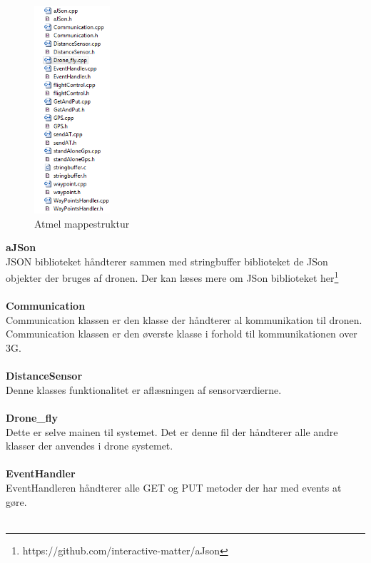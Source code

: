 \begin{figure}[H]
	\centering
	\includegraphics[width=0.25\textwidth]{Billeder/implementation/Howtoguide/atmel_filer.png}
	\caption{Atmel mappestruktur}
	\label{fig:drone_mappestruktur}
\end{figure}

\textbf{aJSon}\\
JSON biblioteket håndterer sammen med stringbuffer biblioteket de JSon objekter der bruges af dronen. Der kan læses mere om JSon biblioteket her\footnote{https://github.com/interactive-matter/aJson} \\ \\

\textbf{Communication}\\
Communication klassen er den klasse der håndterer al kommunikation til dronen. Communication klassen er den øverste klasse i forhold til kommunikationen over 3G. \\ \\

\textbf{DistanceSensor}\\
Denne klasses funktionalitet er aflæsningen af sensorværdierne. \\ \\

\textbf{Drone\_fly}\\
Dette er selve mainen til systemet. Det er denne fil der håndterer alle andre klasser der anvendes i drone systemet. \\ \\

\textbf{EventHandler}\\
EventHandleren håndterer alle GET og PUT metoder der har med events at gøre. \\ \\

